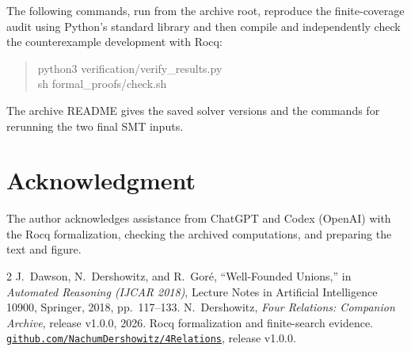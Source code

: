 \documentclass[11pt]{amsart}
\begin{document}
The following commands, run from the archive root, reproduce the finite-coverage audit using Python's standard library and then compile and independently check the counterexample development with Rocq:
\begin{quote}\ttfamily
python3 verification/verify\_results.py\\
sh formal\_proofs/check.sh
\end{quote}
The archive README gives the saved solver versions and the commands for rerunning the two final SMT inputs.

\section*{Acknowledgment}
The author acknowledges assistance from ChatGPT and Codex (OpenAI) with the Rocq formalization, checking the archived computations, and preparing the text and figure.

\enlargethispage{2\baselineskip}
\begin{thebibliography}{2}
J.~Dawson, N.~Dershowitz, and R.~Gor\'e, ``Well-Founded Unions,'' in \emph{Automated Reasoning (IJCAR 2018)}, Lecture Notes in Artificial Intelligence 10900, Springer, 2018, pp.~117--133.
N.~Dershowitz, \emph{Four Relations: Companion Archive}, release v1.0.0, 2026.
Rocq formalization and finite-search evidence.
\href{https://github.com/NachumDershowitz/4Relations/releases/tag/v1.0.0}{\nolinkurl{github.com/NachumDershowitz/4Relations}}, release v1.0.0.
\end{thebibliography}
\end{document}
